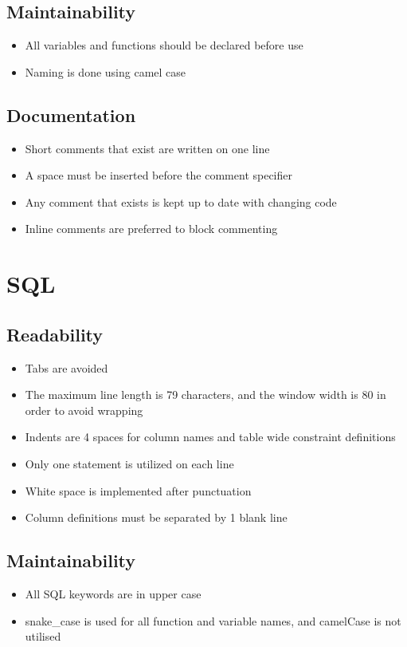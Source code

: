 \documentclass[11pt, a4paper]{article}
\begin{document}
\subsection{Maintainability}
\begin{itemize}
	\item All variables and functions should be declared before use
	\item Naming is done using camel case
\end{itemize}
\subsection{Documentation}
\begin{itemize}
	\item Short comments that exist are written on one line
	\item A space must be inserted before the comment specifier
	\item Any comment that exists is kept up to date with changing code 
	\item Inline comments are preferred to block commenting
\end{itemize}

\section{SQL}
\subsection{Readability}
\begin{itemize}
	\item Tabs are avoided
	\item The maximum line length is 79 characters, and the window width is 80 in order to avoid wrapping
	\item Indents are 4 spaces for column names and table wide constraint definitions
	\item Only one statement is utilized on each line
	\item White space is implemented after punctuation
	\item Column definitions must be separated by 1 blank line
\end{itemize}
\subsection{Maintainability}
\begin{itemize}
	\item All SQL keywords are in upper case
	\item snake\_case is used for all function and variable names, and camelCase is not utilised
\end{itemize}
\end{document}
